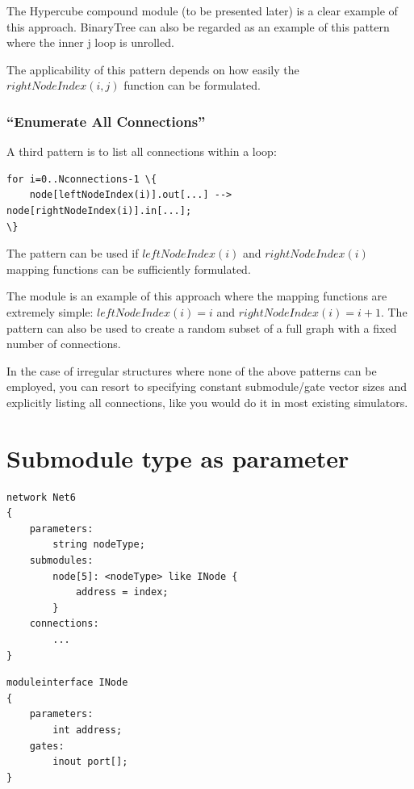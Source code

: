The Hypercube compound module (to be
presented later) is a clear example of this approach. BinaryTree can
also be regarded as an example of this pattern where the inner j loop
is unrolled.

The applicability of this pattern depends on how easily the $rightNodeIndex(i,j)$
function can be formulated.


\subsubsection{``Enumerate All Connections''}


A third pattern is to list all connections within a loop:

\begin{Verbatim}[commandchars=\\\{\}]
for i=0..Nconnections-1 \{
    node[leftNodeIndex(i)].out[...] --> node[rightNodeIndex(i)].in[...];
\}
\end{Verbatim}

The pattern can be used if $leftNodeIndex(i)$ and $rightNodeIndex(i)$
mapping functions can be sufficiently formulated.

The  module is an example of this approach where the mapping
functions are extremely simple: $leftNodeIndex(i)=i$ and $rightNodeIndex(i) = i+1$.
The pattern can also be used to create a random subset of a full
graph with a fixed number of connections.

In the case of irregular structures where none of the above patterns
can be employed, you can resort to specifying constant submodule/gate
vector sizes and explicitly listing all connections, like you
would do it in most existing simulators.



\section{Submodule type as parameter}

\begin{Verbatim}
network Net6
{
    parameters:
        string nodeType;
    submodules:
        node[5]: <nodeType> like INode {
            address = index;
        }
    connections:
        ...
}
\end{Verbatim}

\begin{Verbatim}
moduleinterface INode
{
    parameters:
        int address;
    gates:
        inout port[];
}
\end{Verbatim}

